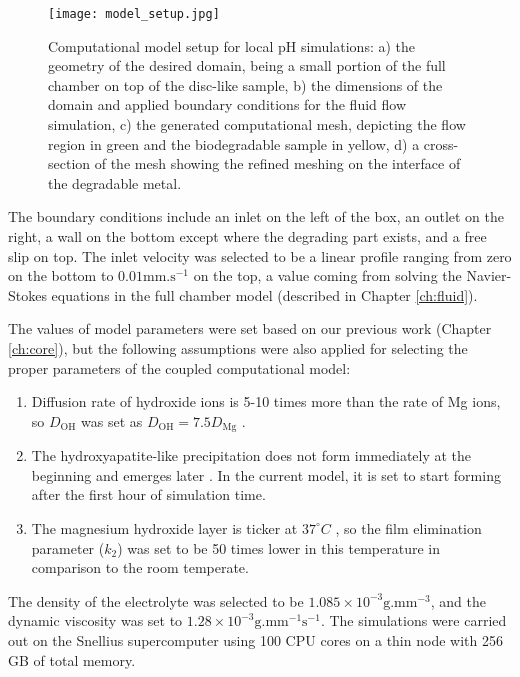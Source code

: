 \begin{figure}[h]
\centering
\medskip
\texttt{[image: model\_setup.jpg]}
\caption[Computational model setup for local pH simulations]{Computational model setup for local pH simulations: a) the geometry of the desired domain, being a small portion of the full chamber on top of the disc-like sample, b) the dimensions of the domain and applied boundary conditions for the fluid flow simulation, c) the generated computational mesh, depicting the flow region in green and the biodegradable sample in yellow, d) a cross-section of the mesh showing the refined meshing on the interface of the degradable metal.} \label{fig:kinetics_model_setup}
\end{figure}

The boundary conditions include an inlet on the left of the box, an outlet on the right, a wall on the bottom except where the degrading part exists, and a free slip on top. The inlet velocity was selected to be a linear profile ranging from zero on the bottom to $0.01 \text{mm.s}^{-1}$ on the top, a value coming from solving the Navier-Stokes equations in the full chamber model (described in Chapter \ref{ch:fluid}).

The values of model parameters were set based on our previous work \cite{Barzegari2021} (Chapter \ref{ch:core}), but the following assumptions were also applied for selecting the proper parameters of the coupled computational model:
\begin{enumerate}
\item
Diffusion rate of hydroxide ions is 5-10 times more than the rate of Mg ions, so $D_{\mathrm{OH}}$ was set as $D_{\mathrm{OH}} = 7.5 D_{\mathrm{Mg}}$ \cite{Gonzalez2021}.
\item
The hydroxyapatite-like precipitation does not form immediately at the beginning and emerges later \cite{Gonzalez2021,Wang2022}. In the current model, it is set to start forming after the first hour of simulation time.
\item
The magnesium hydroxide layer is ticker at $37^{\circ}C$ \cite{Wang2022}, so the film elimination parameter ($k_2$) was set to be 50 times lower in this temperature in comparison to the room temperate.
\end{enumerate}

The density of the electrolyte was selected to be $1.085\times10^{-3} \text{g.mm}^{-3}$, and the dynamic viscosity was set to $1.28\times10^{-3} \text{g.mm}^{-1}\text{s}^{-1}$. The simulations were carried out on the Snellius supercomputer using 100 {CPU} cores on a thin node with 256 GB of total memory.


